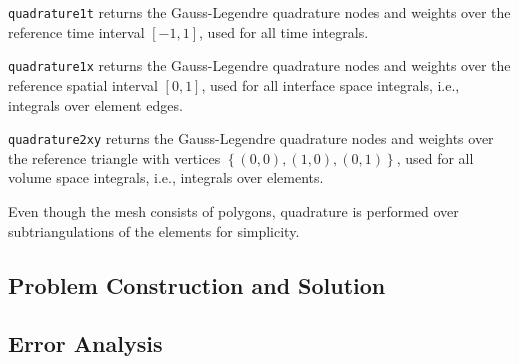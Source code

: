 \lstinline{quadrature1t} returns the Gauss-Legendre quadrature nodes and weights over the reference time interval $\left[ -1, 1 \right]$, used for all time integrals.

\lstinline{quadrature1x} returns the Gauss-Legendre quadrature nodes and weights over the reference spatial interval $\left[ 0, 1 \right]$, used for all interface space integrals, i.e., integrals over element edges.

\lstinline{quadrature2xy} returns the Gauss-Legendre quadrature nodes and weights over the reference triangle with vertices $\left\{ \left( 0, 0 \right), \left( 1, 0 \right), \left( 0, 1 \right) \right\}$, used for all volume space integrals, i.e., integrals over elements.

Even though the mesh consists of polygons, quadrature is performed over subtriangulations of the elements for simplicity.

\newpage
\subsection{Problem Construction and Solution}



\newpage
\subsection{Error Analysis}

